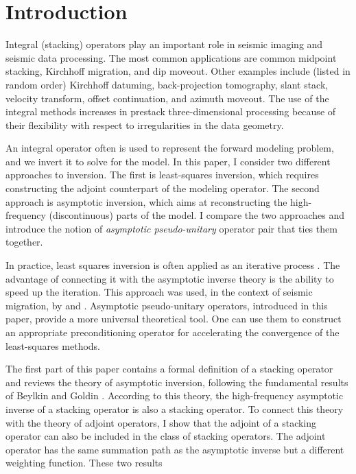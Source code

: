 \section{Introduction}

Integral (stacking) operators play an important role in seismic
imaging and seismic data processing. The most common applications are
common midpoint stacking, Kirchhoff migration, and dip moveout.  Other
examples include (listed in random order) Kirchhoff datuming,
back-projection tomography, slant stack, velocity transform, offset
continuation, and azimuth moveout. The use of the integral methods
increases in prestack three-dimensional processing because of their
flexibility with respect to irregularities in the data geometry.
\par
An integral operator often is used to represent the forward modeling
problem, and we invert it to solve for the model. In this paper, I
consider two different approaches to inversion. The first is
least-squares inversion, which requires constructing the adjoint
counterpart of the modeling operator.  The second approach is
asymptotic inversion, which aims at reconstructing the high-frequency
(discontinuous) parts of the model. I compare the two approaches and
introduce the notion of \emph{asymptotic pseudo-unitary} operator pair 
that ties them together.
\par
In practice, least squares inversion is often applied as an iterative
process \cite[]{GEO65-05-13641371}. The advantage of connecting it with
the asymptotic inverse theory is the ability to speed up the
iteration. This approach was used, in the context of seismic
migration, by \cite{jin} and \cite{lambare}.  Asymptotic
pseudo-unitary operators, introduced in this paper, provide a more
universal theoretical tool. One can use them to construct an
appropriate preconditioning operator for accelerating the convergence
of the least-squares methods.
\par
The first part of this paper contains a formal definition of a stacking
operator and reviews the theory of asymptotic inversion, following the
fundamental results of Beylkin  and Goldin
.  According to this theory, the
high-frequency asymptotic inverse of a stacking operator is also a stacking
operator. To connect this theory with the theory of adjoint operators, I show
that the adjoint of a stacking operator can also be included in the class of
stacking operators.  The adjoint operator has the same summation path as the
asymptotic inverse but a different weighting function.  These two results
